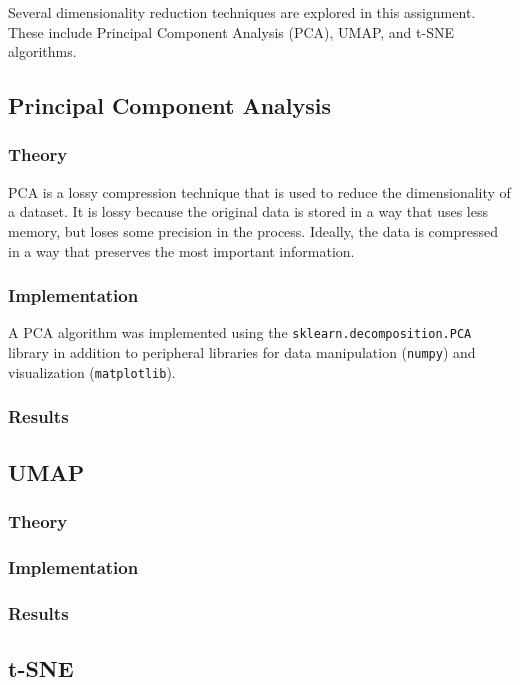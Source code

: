 \documentclass[12pt]{article}
\begin{document}
Several dimensionality reduction techniques are explored in this assignment. These include Principal Component Analysis (PCA), UMAP, and t-SNE algorithms.

\subsection{Principal Component Analysis}
\subsubsection{Theory}
PCA is a lossy compression technique that is used to reduce the dimensionality of a dataset. It is lossy because the original data is stored in a way that uses less memory, but loses some precision in the process. Ideally, the data is compressed in a way that preserves the most important information.



\subsubsection{Implementation}
A PCA algorithm was implemented using the \verb|sklearn.decomposition.PCA| library in addition to peripheral libraries for data manipulation (\verb|numpy|) and visualization (\verb|matplotlib|).

\subsubsection{Results}

\subsection{UMAP}
\subsubsection{Theory}

\subsubsection{Implementation}

\subsubsection{Results}

\subsection{t-SNE}
\end{document}
